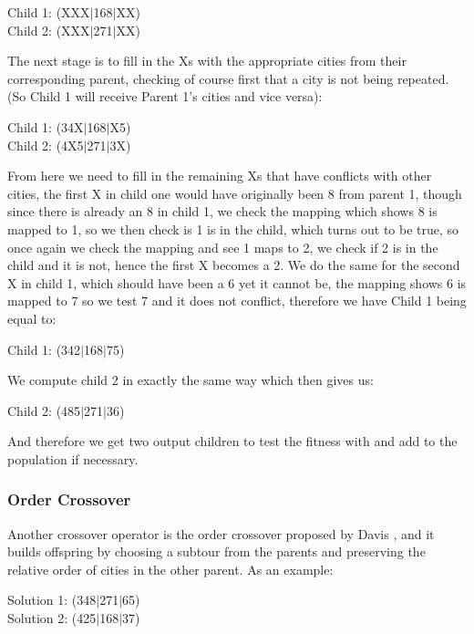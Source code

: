 \documentclass[11pt,a4paper,titlepage]{article}
\begin{document}
\begin{center}\Large
Child 1: (XXX$|$168$|$XX)\\
Child 2: (XXX$|$271$|$XX)
\end{center}

The next stage is to fill in the Xs with the appropriate cities from their corresponding parent, checking of course first that a city is not being repeated. (So Child 1 will receive Parent 1's cities and vice versa):

\begin{center}\Large
Child 1: (34X$|$168$|$X5)\\
Child 2: (4X5$|$271$|$3X)
\end{center}

From here we need to fill in the remaining Xs that have conflicts with other cities, the first X in child one would have originally been 8 from parent 1, though since there is already an 8 in child 1, we check the mapping which shows 8 is mapped to 1, so we then check is 1 is in the child, which turns out to be true, so once again we check the mapping and see 1 maps to 2, we check if 2 is in the child and it is not, hence the first X becomes a 2. We do the same for the second X in child 1, which should have been a 6 yet it cannot be, the mapping shows 6 is mapped to 7 so we test 7 and it does not conflict, therefore we have Child 1 being equal to:

\begin{center}\Large
Child 1: (342$|$168$|$75)
\end{center}

We compute child 2 in exactly the same way which then gives us:

\begin{center}\Large
Child 2: (485$|$271$|$36)
\end{center}

And therefore we get two output children to test the fitness with and add to the population if necessary.

\subsubsection{Order Crossover}

Another crossover operator is the order crossover proposed by Davis \cite{GACrossover}, and it builds offspring by choosing a subtour from the parents and preserving the relative order of cities in the other parent. As an example:

\begin{center}\Large
Solution 1: (348$|$271$|$65)\\
Solution 2: (425$|$168$|$37)
\end{center}
\end{document}
